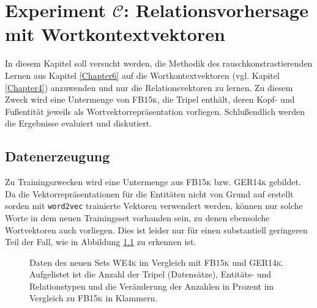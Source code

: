 
\chapter{Experiment $\mathcal{C}$: Relationsvorhersage mit Wortkontextvektoren} %

\label{Chapter8} %


In diesem Kapitel soll versucht werden, die Methodik des rauschkonstrastierenden Lernen aus Kapitel \ref{Chapter6}
auf die Wortkontextvektoren (vgl. Kapitel \ref{Chapter4}) anzuwenden und nur die Relationsvektoren zu lernen. Zu diesem Zweck
wird eine Untermenge von \textsc{FB15k}, die Tripel enthält, deren Kopf- und Fußentität jeweils als Wortvektorrepräsentation vorliegen.
Schlußendlich werden die Ergebnisse evaluiert und diskutiert.

\section{Datenerzeugung}

Zu Trainingszwecken wird eine Untermenge aus \textsc{FB15k} bzw. \textsc{GER14k} gebildet. Da
die Vektorrepräsentationen für die Entitäten nicht von Grund auf erstellt sorden mit
\verb|word2vec| trainierte Vektoren verwendert werden, können nur solche Worte in dem
neuen Trainingsset vorhanden sein, zu denen ebensolche Wortvektoren auch vorliegen.
Dies ist leider nur für einen substantiell geringeren Teil der Fall, wie in Abbildung \ref{fig:we4k} zu
erkennen ist.

\begin{figure}[h]
  \centering
  \begin{changemargin}{0cm}{0cm}
\end{changemargin}
  \caption[Daten des neuen Relationsdatensets im Vergleich zu \textsc{FB15k} und \textsc{GER14k}]{Daten des neuen Sets \textsc{WE4k} im Vergleich mit
  \textsc{FB15k} und \textsc{GER14k}. Aufgelistet ist die Anzahl der Tripel (Datensätze), Entitäts- und Relationstypen und die Veränderung
  der Anzahlen in Prozent im Vergleich zu \textsc{FB15k} in Klammern.\label{fig:we4k}}
\end{figure}

